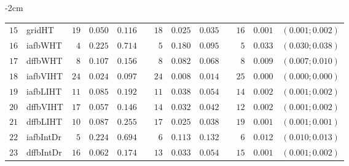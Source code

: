 \begin{table*}[!htbp]
\begin{adjustwidth*}{}{-2cm}
\begin{tabular}{@{}rlrrrrrrrrrcc@{}}
\footnotesize{$15$} & \footnotesize{gridHT   } & \footnotesize{$19$} & \footnotesize{$0.050$} & \footnotesize{$0.116$} && \footnotesize{$18$} & \footnotesize{$0.025$} & \footnotesize{$0.035$} && \footnotesize{$16$} & \footnotesize{$0.001$} & \footnotesize{$(0.001;0.002)$} \\
\footnotesize{$16$} & \footnotesize{iafbWHT  } & \footnotesize{$4 $} & \footnotesize{$0.225$} & \footnotesize{$0.714$} && \footnotesize{$5 $} & \footnotesize{$0.180$} & \footnotesize{$0.095$} && \footnotesize{$5 $} & \footnotesize{$0.033$} & \footnotesize{$(0.030;0.038)$} \\
\footnotesize{$17$} & \footnotesize{dffbWHT  } & \footnotesize{$8 $} & \footnotesize{$0.107$} & \footnotesize{$0.156$} && \footnotesize{$8 $} & \footnotesize{$0.082$} & \footnotesize{$0.068$} && \footnotesize{$8 $} & \footnotesize{$0.009$} & \footnotesize{$(0.007;0.010)$} \\
\footnotesize{$18$} & \footnotesize{iafbVIHT } & \footnotesize{$24$} & \footnotesize{$0.024$} & \footnotesize{$0.097$} && \footnotesize{$24$} & \footnotesize{$0.008$} & \footnotesize{$0.014$} && \footnotesize{$25$} & \footnotesize{$0.000$} & \footnotesize{$(0.000;0.000)$} \\
\footnotesize{$19$} & \footnotesize{iafbLIHT } & \footnotesize{$11$} & \footnotesize{$0.085$} & \footnotesize{$0.192$} && \footnotesize{$11$} & \footnotesize{$0.038$} & \footnotesize{$0.054$} && \footnotesize{$14$} & \footnotesize{$0.002$} & \footnotesize{$(0.001;0.002)$} \\
\footnotesize{$20$} & \footnotesize{dffbVIHT } & \footnotesize{$17$} & \footnotesize{$0.057$} & \footnotesize{$0.146$} && \footnotesize{$14$} & \footnotesize{$0.032$} & \footnotesize{$0.042$} && \footnotesize{$12$} & \footnotesize{$0.002$} & \footnotesize{$(0.001;0.002)$} \\
\footnotesize{$21$} & \footnotesize{dffbLIHT } & \footnotesize{$10$} & \footnotesize{$0.087$} & \footnotesize{$0.255$} && \footnotesize{$17$} & \footnotesize{$0.025$} & \footnotesize{$0.038$} && \footnotesize{$19$} & \footnotesize{$0.001$} & \footnotesize{$(0.001;0.001)$} \\
\footnotesize{$22$} & \footnotesize{iafbIntDr} & \footnotesize{$5 $} & \footnotesize{$0.224$} & \footnotesize{$0.694$} && \footnotesize{$6 $} & \footnotesize{$0.113$} & \footnotesize{$0.132$} && \footnotesize{$6 $} & \footnotesize{$0.012$} & \footnotesize{$(0.010;0.013)$} \\
\footnotesize{$23$} & \footnotesize{dffbIntDr} & \footnotesize{$16$} & \footnotesize{$0.062$} & \footnotesize{$0.174$} && \footnotesize{$13$} & \footnotesize{$0.033$} & \footnotesize{$0.054$} && \footnotesize{$15$} & \footnotesize{$0.001$} & \footnotesize{$(0.001;0.002)$} \\

\end{tabular}
\end{adjustwidth*}
\end{table*}

